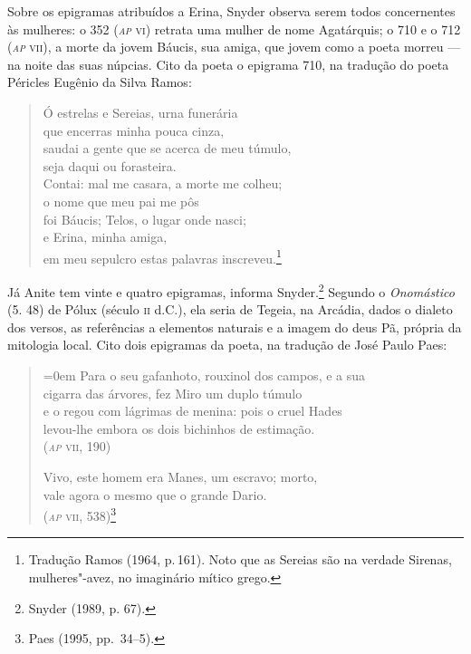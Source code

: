 Sobre os epigramas atribuídos a Erina, Snyder observa
serem todos concernentes às mulheres: o 352 (\textit{\textsc{ap}} \textsc{vi})
retrata uma mulher de nome Agatárquis; o 710 e o 712 (\textit{\textsc{ap}} \textsc{vii}), a morte da jovem
Báucis, sua amiga, que jovem como a poeta morreu --- na noite das suas núpcias.
Cito da poeta o epigrama 710, na tradução do poeta Péricles Eugênio da Silva Ramos:

\begin{quote}
Ó estrelas e Sereias, urna funerária\\ 
\quad que encerras minha pouca cinza,\\
saudai a gente que se acerca de meu túmulo,\\
\quad seja daqui ou forasteira.\\
Contai: mal me casara, a morte me colheu;\\
\quad o nome que meu pai me pôs\\
foi Báucis; Telos, o lugar onde nasci;\\
\quad e Erina, minha amiga,\\
em meu sepulcro estas palavras inscreveu.\footnote{Tradução Ramos (1964, p.\,161). Noto que as Sereias são na verdade Sirenas, mulheres"-avez, no imaginário mítico grego.}
\end{quote}

Já Anite tem vinte e quatro
epigramas, informa Snyder.\footnote{ Snyder (1989, p. 67).} Segundo o \textit{Onomástico} (5. 48) de
Pólux (século \textsc{ii} d.C.), ela seria de Tegeia, na Arcádia, dados o dialeto dos
versos, as referências a elementos naturais e a imagem do deus Pã, própria da
mitologia local. Cito dois epigramas da poeta, na tradução de José Paulo Paes:

\begin{quote}\parindent=0em 
Para o seu gafanhoto, rouxinol dos campos, e a sua\\
cigarra das árvores, fez Miro um duplo túmulo\\
e o regou com lágrimas de menina: pois o cruel Hades\\
levou-lhe embora os dois bichinhos de estimação.\\
\mbox{}\hfill (\textsc{\textit{ap} vii}, 190)

\smallskip

Vivo, este homem era Manes, um escravo; morto,\\
vale agora o mesmo que o grande Dario.\\
\mbox{}\hfill (\textsc{\textit{ap} vii}, 538)\footnote{ Paes (1995, pp.~34--5).}
\end{quote}

